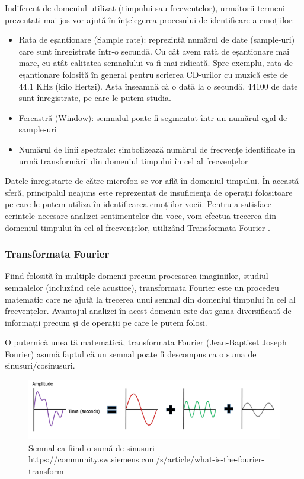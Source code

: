 \documentclass[a4paper, 12pt]{report}
\begin{document}
	Indiferent de domeniul utilizat (timpului sau frecventelor), următorii termeni prezentați mai jos vor ajută în înțelegerea procesului de identificare a emoțiilor:
	
  	\begin{itemize} 
  		\item Rata de eșantionare (Sample rate): reprezintă numărul de date (sample-uri) care sunt înregistrate într-o secundă. Cu cât avem rată de eșantionare mai mare, cu atât calitatea semnalului va fi mai ridicată. Spre exemplu, rata de eșantionare folosită în general pentru scrierea CD-urilor cu muzică este de 44.1 KHz (kilo Hertzi). Asta înseamnă că o dată la o secundă, 44100 de date sunt înregistrate, pe care le putem studia. 
  		\item Fereastră (Window): semnalul poate fi segmentat într-un numărul egal de sample-uri 
  		\item Numărul de linii spectrale: simbolizează numărul de frecvențe identificate în urmă transformării din domeniul timpului în cel al frecvențelor 
  	\end{itemize} 
 	 Datele înregistarte de către microfon se vor află în domeniul timpului. În această sferă, principalul neajuns este reprezentat de insuficiența de operații folositoare pe care le putem utiliza în identificarea emoțiilor vocii. Pentru a satisface cerințele necesare analizei sentimentelor din voce, vom efectua trecerea din domeniul timpului în cel al frecvențelor, utilizând Transformata Fourier \cite{ft}. 
  
 	 \clearpage 
  	\subsubsection{Transformata Fourier} 
  	Fiind folosită în multiple domenii precum procesarea imaginiilor, studiul semnalelor (incluzând cele acustice), transformata Fourier este un procedeu matematic care ne ajută la trecerea unui semnal din domeniul timpului în cel al frecvențelor. Avantajul analizei în acest domeniu este dat gama diversificată de informații precum și de operații pe care le putem folosi. 
  	
  	O puternică unealtă matematică, transformata Fourier (Jean-Baptiset Joseph Fourier) asumă faptul că un semnal poate fi descompus ca o suma de sinusuri/cosinusuri.
	
	\begin{figure}[h]
		\begin{center}
			\includegraphics[width=\linewidth]{images/signals.png}
		\end{center}
		\caption{Semnal ca fiind o sumă de sinusuri\newline
			\hspace{\linewidth}https://community.sw.siemens.com/s/article/what-is-the-fourier-transform}
		\label{fig:singal_to_sinuses}
	\end{figure}
\end{document}
